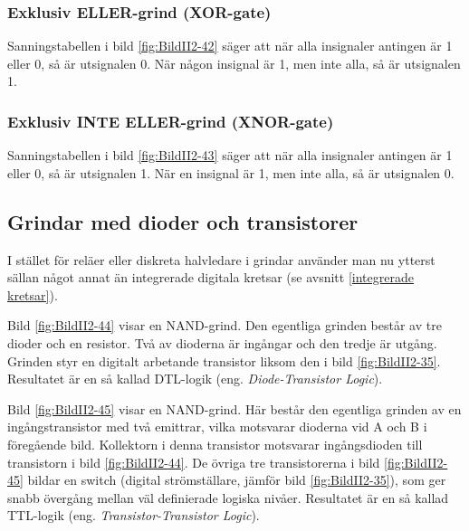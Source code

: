 
\clearpage

\subsubsection{Exklusiv ELLER-grind (XOR-gate)}


Sanningstabellen i bild \ref{fig:BildII2-42} säger att när alla insignaler antingen är 1 eller 0, så är utsignalen 0.
När någon insignal är 1, men inte alla, så är utsignalen 1.

\subsubsection{Exklusiv INTE ELLER-grind (XNOR-gate)}


Sanningstabellen i bild \ref{fig:BildII2-43} säger att när alla insignaler antingen är 1 eller 0, så är utsignalen 1.
När en insignal är 1, men inte alla, så är utsignalen 0.

\subsection{Grindar med dioder och transistorer}

I stället för reläer eller diskreta halvledare i grindar använder man nu ytterst sällan något annat än integrerade digitala kretsar (se avsnitt \ref{integrerade kretsar}).


Bild \ref{fig:BildII2-44} visar en NAND-grind.
Den egentliga grinden består av tre dioder och en resistor.
Två av dioderna är ingångar och den tredje är utgång.
Grinden styr en digitalt arbetande transistor liksom den i bild
\ref{fig:BildII2-35}.
Resultatet är en så kallad DTL-logik (eng. \emph{Diode-Transistor Logic}).


Bild \ref{fig:BildII2-45} visar en NAND-grind.
Här består den egentliga grinden av en ingångstransistor med två emittrar,
vilka motsvarar dioderna vid A och B i föregående bild.
Kollektorn i denna transistor motsvarar ingångsdioden till transistorn i bild
\ref{fig:BildII2-44}.
De övriga tre transistorerna i bild \ref{fig:BildII2-45} bildar en switch (digital strömställare, jämför bild \ref{fig:BildII2-35}),
som ger snabb övergång mellan väl definierade logiska nivåer.
Resultatet är en så kallad TTL-logik (eng. \emph{Transistor-Transistor Logic}).
